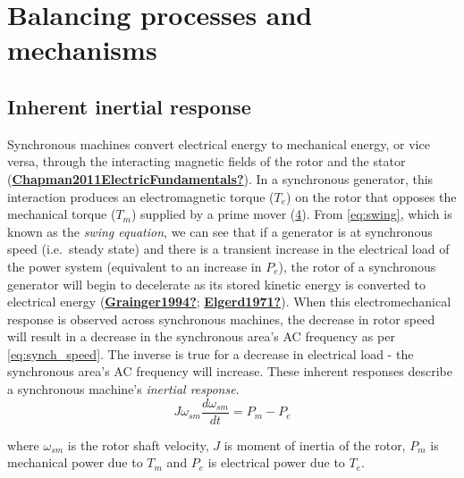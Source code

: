 \documentclass[12pt,a4paper,]{report}
\begin{document}
\hypertarget{balancing-processes-and-mechanisms}{%
\section{Balancing processes and
mechanisms}\label{balancing-processes-and-mechanisms}}

\hypertarget{sec:electromech}{%
\subsection{Inherent inertial response}\label{sec:electromech}}

Synchronous machines convert electrical energy to mechanical energy, or
vice versa, through the interacting magnetic fields of the rotor and the
stator
(\protect\hyperlink{ref-Chapman2011ElectricFundamentals}{\textbf{Chapman2011ElectricFundamentals?}}).
In a synchronous generator, this interaction produces an electromagnetic
torque (\(T_e\)) on the rotor that opposes the mechanical torque
(\(T_m\)) supplied by a prime mover
(\protect\hyperlink{fig:synch_torques}{4}). From
\protect\hyperlink{eq:swing}{{[}eq:swing{]}}, which is known as the
\emph{swing equation}, we can see that if a generator is at synchronous
speed (i.e.~steady state) and there is a transient increase in the
electrical load of the power system (equivalent to an increase in
\(P_e\)), the rotor of a synchronous generator will begin to decelerate
as its stored kinetic energy is converted to electrical energy
(\protect\hyperlink{ref-Grainger1994}{\textbf{Grainger1994?}};
\protect\hyperlink{ref-Elgerd1971}{\textbf{Elgerd1971?}}). When this
electromechanical response is observed across synchronous machines, the
decrease in rotor speed will result in a decrease in the synchronous
area's AC frequency as per
\protect\hyperlink{eq:synch_speed}{{[}eq:synch\_speed{]}}. The inverse
is true for a decrease in electrical load - the synchronous area's AC
frequency will increase. These inherent responses describe a synchronous
machine's \emph{inertial response}.
\[J\omega_{sm}\frac{d\omega_{sm}}{dt} = P_m - P_e
        \label{eq:swing}\]

where \(\omega_{sm}\) is the rotor shaft velocity, \(J\) is moment of
inertia of the rotor, \(P_m\) is mechanical power due to \(T_m\) and
\(P_e\) is electrical power due to \(T_e\).
\end{document}
